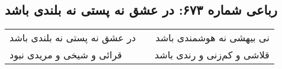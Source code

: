 \begin{center}
\section*{رباعی شماره ۶۷۳: در عشق نه پستی نه بلندی باشد}
\label{sec:0673}
\begin{longtable}{l p{0.5cm} r}
در عشق نه پستی نه بلندی باشد
&&
نی بیهشی نه هوشمندی باشد
\\
قرائی و شیخی و مریدی نبود
&&
قلاشی و کم‌زنی و رندی باشد
\\
\end{longtable}
\end{center}
